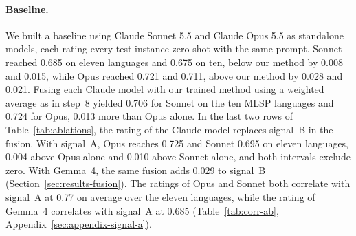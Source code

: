 \documentclass[11pt]{article}
\begin{document}
\paragraph{Baseline.} We built a baseline using Claude Sonnet 5.5 and Claude Opus 5.5 as standalone
models, each rating every test instance zero-shot with the same prompt. Sonnet reached 0.685 on %
eleven languages and 0.675 on ten, below our method by 0.008 and 0.015, while Opus reached 0.721 and
0.711, above our method by 0.028 and 0.021. Fusing each Claude model with our trained method using a %
weighted average as in step~8 yielded 0.706 for Sonnet on the ten MLSP languages and 0.724 for Opus,
0.013 more than Opus alone. In the last two rows of Table~\ref{tab:ablations}, the rating of the %
Claude model replaces signal~B in the fusion. With signal~A, Opus reaches 0.725 and Sonnet 0.695 on
eleven languages, 0.004 above Opus alone and 0.010 above Sonnet alone, and both intervals exclude
zero. With Gemma~4, the same fusion adds 0.029 to signal~B (Section~\ref{sec:results-fusion}). The %
ratings of Opus and Sonnet both correlate with signal~A at 0.77 on average over the eleven
languages, while the rating of Gemma~4 correlates with signal~A at 0.685 %
(Table~\ref{tab:corr-ab}, Appendix~\ref{sec:appendix-signal-a}).
\end{document}
